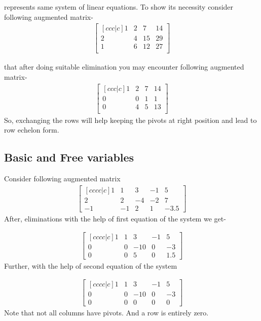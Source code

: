 \documentclass{article}
\begin{document}
\) represents same system of linear equations. To show its necessity consider following augmented matrix-
\begin{align}
\begin{bmatrix}[ccc|c] 
1 & 2 & 7 & 14 \\
2 & 4 & 15 & 29 \\
1 & 6 & 12 & 27 \\
\end{bmatrix}\nonumber
\end{align}

that after doing suitable elimination you may encounter following augmented matrix-\\
\begin{align}
\begin{bmatrix}[ccc|c] 
1 & 2 & 7 & 14 \\
0 & 0 & 1 & 1 \\
0 & 4 & 5 & 13 \\
\end{bmatrix}\nonumber
\end{align}
So, exchanging the rows will help keeping the pivots at right position and lead to row echelon form.\\

\subsection{Basic and Free variables}
Consider following augmented matrix
\begin{align}
\begin{bmatrix}[cccc|c] 
1 & 1 & 3 & -1 & 5 \\
2 & 2 & -4 & -2 & 7 \\
-1 & -1 & 2 & 1 & -3.5 
\end{bmatrix}\nonumber
\end{align}
After, eliminations with the help of first equation of the system we get-

\begin{align}
\begin{bmatrix}[cccc|c] 
1 & 1 & 3 & -1 & 5 \\
0 & 0 & -10 & 0 & -3 \\
0 & 0 & 5 & 0 & 1.5 
\end{bmatrix}\nonumber
\end{align}
Further, with the help of second equation of the system

\begin{align}
\begin{bmatrix}[cccc|c] 
1 & 1 & 3 & -1 & 5 \\
0 & 0 & -10 & 0 & -3 \\
0 & 0 & 0 & 0 & 0 
\end{bmatrix}\label{ef1}
\end{align}
Note that not all columns have pivots. And a row is entirely zero.\\
\end{document}
